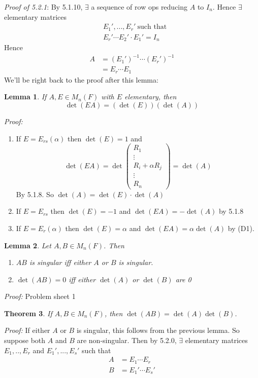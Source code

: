 \documentclass{report}
\newtheorem{theorem}{Theorem}[subsection]
\newtheorem{lemma}[theorem]{Lemma}
\theoremstyle{remark}
\theoremstyle{definition}
\theoremstyle{definition}
\theoremstyle{theorem}
\begin{document}
\emph{Proof of 5.2.1}:
By 5.1.10, $\exists$ a sequence of row ops reducing $A$ to $I_n$. Hence $\exists$ elementary matrices
\begin{align*}
    &E_1',...,E_r' \> \text{such that}\\
    &E_r' \cdots E_2'\cdot E_1' = I_n
\end{align*}
Hence
\begin{align*}
    A &= (E_1')^{-1}\cdots (E_r')^{-1}\\
    &= E_r \cdots E_1
\end{align*}
We'll be right back to the proof after this lemma:
\begin{lemma}
If $A, E \in M_n(F)$ with $E$ elementary, then
\[\det(EA)=(\det(E))(\det(A))\]
\end{lemma}
\emph{Proof:} 
\begin{enumerate}
    \item If $E = E_{rs}(\alpha)$ then $\det(E)=1$ and
\[\det(EA)= \det\begin{pmatrix}
R_1\\\vdots\\R_i + \alpha R_j\\ \vdots\\ R_n
\end{pmatrix} = \det(A)\]
By 5.1.8. So $\det(A) = \det(E) \cdot \det(A)$
    \item If $E=E_{rs}$ then $\det(E)=-1$ and $\det(EA)=-\det(A)$ by 5.1.8
    \item If $E=E_r(\alpha)$ then $\det(E)=\alpha$ and $\det(EA)=\alpha\det(A)$ by (D1).
\end{enumerate}
\begin{lemma}
Let $A,B \in M_n(F)$. Then
\begin{enumerate}
    \item $AB$ is singular iff either $A$ or $B$ is singular.
    \item $\det(AB)=0$ iff either $\det(A)$ or $\det(B)$ are 0
\end{enumerate}
\end{lemma}
\emph{Proof:} Problem sheet 1
\begin{theorem}
If $A,B \in M_n(F)$, then $\det(AB)=\det(A)\det(B)$. 
\end{theorem}
\emph{Proof:} If either $A$ or $B$ is singular, this follows from the previous lemma. So suppose both $A$ and $B$ are non-singular. Then by 5.2.0, $\exists$ elementary matrices $E_1,..,E_r$ and $E_1',...,E_s'$ such that
\begin{align*}
    A &= E_1 \cdots E_r\\
    B &= E_1' \cdots E_s'
\end{align*}
\end{document}
